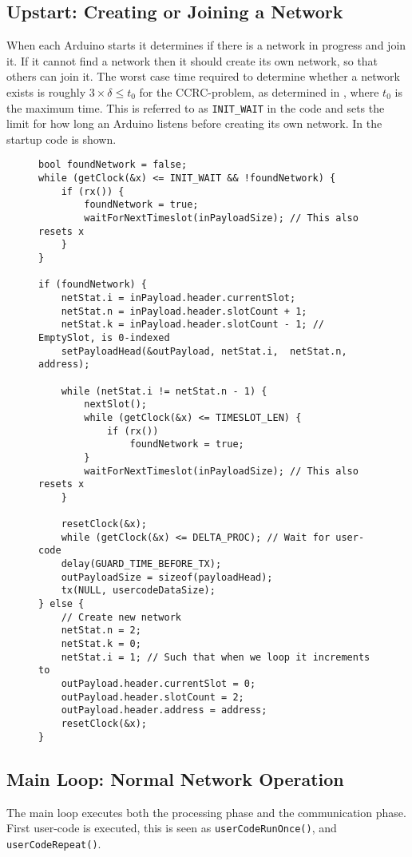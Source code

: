 \subsection{Upstart: Creating or Joining a Network}
When each Arduino starts it determines if there is a network in progress and join it. 
If it cannot find a network then it should create its own network, so that others can join it. 
The worst case time required to determine whether a network exists is roughly $3 \times \delta \leq t_0$ for the CCRC-problem, as determined in , where $t_0$ is the maximum time. 
This is referred to as \texttt{INIT\_WAIT} in the code and sets the limit for how long an Arduino listens before creating its own network. 
In  the startup code is shown. 
\begin{figure}
\begin{lstlisting}[style=customc,caption={Startup, if a network is found join it, if not create one.},label={lst:ccrc:startup}]
bool foundNetwork = false;
while (getClock(&x) <= INIT_WAIT && !foundNetwork) {
    if (rx()) {
        foundNetwork = true;
        waitForNextTimeslot(inPayloadSize); // This also resets x
    }
}

if (foundNetwork) {
    netStat.i = inPayload.header.currentSlot;
    netStat.n = inPayload.header.slotCount + 1;
    netStat.k = inPayload.header.slotCount - 1; // EmptySlot, is 0-indexed
    setPayloadHead(&outPayload, netStat.i,  netStat.n, address);

    while (netStat.i != netStat.n - 1) {
        nextSlot();
        while (getClock(&x) <= TIMESLOT_LEN) {
            if (rx()) 
                foundNetwork = true;
        }
        waitForNextTimeslot(inPayloadSize); // This also resets x
    }

    resetClock(&x);
    while (getClock(&x) <= DELTA_PROC); // Wait for user-code
    delay(GUARD_TIME_BEFORE_TX);
    outPayloadSize = sizeof(payloadHead);
    tx(NULL, usercodeDataSize);
} else {
    // Create new network
    netStat.n = 2;
    netStat.k = 0;
    netStat.i = 1; // Such that when we loop it increments to
    outPayload.header.currentSlot = 0;
    outPayload.header.slotCount = 2;
    outPayload.header.address = address;
    resetClock(&x);
}
\end{lstlisting}
\end{figure}
\subsection{Main Loop: Normal Network Operation}
The main loop executes both the processing phase and the communication phase.
First user-code is executed, this is seen as \texttt{userCodeRunOnce()}, and \texttt{userCodeRepeat()}.

